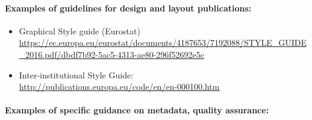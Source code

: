 \documentclass[
]{article}
\begin{document}
\hypertarget{examples-of-guidelines-for-design-and-layout-publications}{%
\paragraph{Examples of guidelines for design and layout publications:}\label{examples-of-guidelines-for-design-and-layout-publications}}

\begin{itemize}
\item
  Graphical Style guide (Eurostat)\\
  \url{https://ec.europa.eu/eurostat/documents/4187653/7192088/STYLE_GUIDE_2016.pdf/dbdf7b92-5ac5-4313-ae80-296f52692e5c}
\item
  Inter-institutional Style Guide:\\
  \url{http://publications.europa.eu/code/en/en-000100.htm}
\end{itemize}

\hypertarget{examples-of-specific-guidance-on-metadata-quality-assurance}{%
\paragraph{Examples of specific guidance on metadata, quality assurance:}\label{examples-of-specific-guidance-on-metadata-quality-assurance}}
\end{document}
